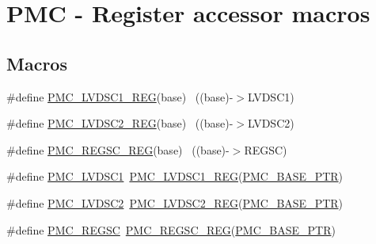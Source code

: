 \hypertarget{group___p_m_c___register___accessor___macros}{}\section{P\+MC -\/ Register accessor macros}
\label{group___p_m_c___register___accessor___macros}
\subsection*{Macros}
\begin{DoxyCompactItemize}
\item 
\#define \hyperlink{group___p_m_c___register___accessor___macros_ga2fe280fb8b910471c6a1308e8507dd25}{P\+M\+C\+\_\+\+L\+V\+D\+S\+C1\+\_\+\+R\+EG}(base)                                      ~((base)-\/$>$L\+V\+D\+S\+C1)
\item 
\#define \hyperlink{group___p_m_c___register___accessor___macros_ga4df6ab8710ac0dd4d7dd3a316de354c8}{P\+M\+C\+\_\+\+L\+V\+D\+S\+C2\+\_\+\+R\+EG}(base)                                      ~((base)-\/$>$L\+V\+D\+S\+C2)
\item 
\#define \hyperlink{group___p_m_c___register___accessor___macros_gababe9178e390666706c6a7f23b1dccb2}{P\+M\+C\+\_\+\+R\+E\+G\+S\+C\+\_\+\+R\+EG}(base)                                        ~((base)-\/$>$R\+E\+G\+SC)
\item 
\#define \hyperlink{group___p_m_c___register___accessor___macros_gae9e90b7b2d3c4f5e0950d074fecb2798}{P\+M\+C\+\_\+\+L\+V\+D\+S\+C1}~\hyperlink{group___p_m_c___register___accessor___macros_ga2fe280fb8b910471c6a1308e8507dd25}{P\+M\+C\+\_\+\+L\+V\+D\+S\+C1\+\_\+\+R\+EG}(\hyperlink{group___p_m_c___peripheral_gaf32df9f1096263f10a5e8978a338b2ac}{P\+M\+C\+\_\+\+B\+A\+S\+E\+\_\+\+P\+TR})
\item 
\#define \hyperlink{group___p_m_c___register___accessor___macros_ga921b48d20e5bc7e7353ac2f59c8135ba}{P\+M\+C\+\_\+\+L\+V\+D\+S\+C2}~\hyperlink{group___p_m_c___register___accessor___macros_ga4df6ab8710ac0dd4d7dd3a316de354c8}{P\+M\+C\+\_\+\+L\+V\+D\+S\+C2\+\_\+\+R\+EG}(\hyperlink{group___p_m_c___peripheral_gaf32df9f1096263f10a5e8978a338b2ac}{P\+M\+C\+\_\+\+B\+A\+S\+E\+\_\+\+P\+TR})
\item 
\#define \hyperlink{group___p_m_c___register___accessor___macros_gad80edb8f69da1769b7367108d8c4f9be}{P\+M\+C\+\_\+\+R\+E\+G\+SC}~\hyperlink{group___p_m_c___register___accessor___macros_gababe9178e390666706c6a7f23b1dccb2}{P\+M\+C\+\_\+\+R\+E\+G\+S\+C\+\_\+\+R\+EG}(\hyperlink{group___p_m_c___peripheral_gaf32df9f1096263f10a5e8978a338b2ac}{P\+M\+C\+\_\+\+B\+A\+S\+E\+\_\+\+P\+TR})

\end{DoxyCompactItemize}

